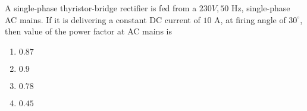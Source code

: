 \iffalse
\chapter{2016}
\author{EE24BTECH11003}
\section{ee}
\fi
\item A single-phase thyristor-bridge rectifier is fed from a $230 V, 50$ Hz, single-phase AC mains. If it is delivering a constant DC current of $10$ A, at firing angle of $30^\circ$, then value of the power factor at AC mains is
\hfill{}
\begin{enumerate}
\item $0.87$
\item $0.9$
\item $0.78$
\item $0.45$
\end{enumerate}

